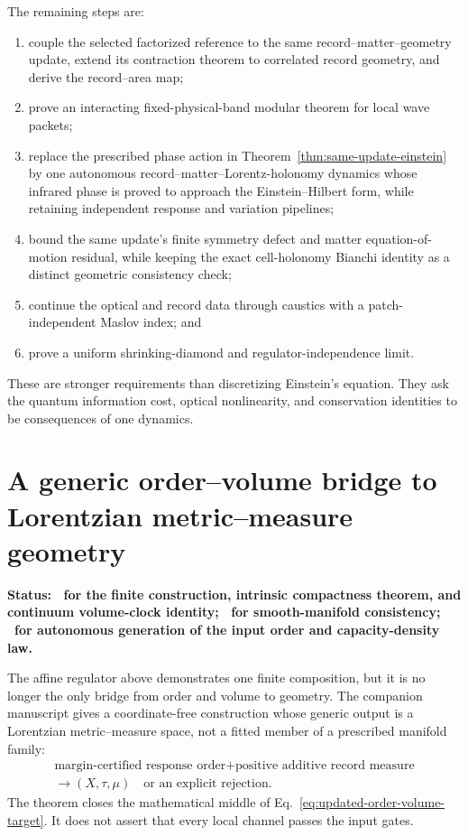 The remaining steps are:
\begin{enumerate}[label=(N\arabic*)]
\item couple the selected factorized reference to the same
record--matter--geometry update, extend its contraction theorem to correlated
record geometry, and derive the record--area map;
\item prove an interacting fixed-physical-band modular theorem for local
wave packets;
\item replace the prescribed phase action in
Theorem~\ref{thm:same-update-einstein} by one autonomous
record--matter--Lorentz-holonomy dynamics whose infrared phase is proved to
approach the Einstein--Hilbert form, while retaining independent response and
variation pipelines;
\item bound the same update's finite symmetry defect and matter
equation-of-motion residual, while keeping the exact cell-holonomy Bianchi
identity as a distinct geometric consistency check;
\item continue the optical and record data through caustics with a
patch-independent Maslov index; and
\item prove a uniform shrinking-diamond and regulator-independence limit.
\end{enumerate}
These are stronger requirements than discretizing Einstein's equation.  They
ask the quantum information cost, optical nonlinearity, and conservation
identities to be consequences of one dynamics.

\section{A generic order--volume bridge to Lorentzian metric--measure geometry}
\label{sec:generic-order-volume}
\label{sec:updated-order-volume}

\textbf{Status: \StatusAbstract\ for the finite construction, intrinsic
compactness theorem, and continuum volume-clock identity;
\StatusConditional\ for smooth-manifold consistency; \StatusOpen\ for
autonomous generation of the input order and capacity-density law.}

The affine regulator above demonstrates one finite composition, but it is no
longer the only bridge from order and volume to geometry.  The companion
manuscript \cite{XuGenericOrderVolume2026} gives a coordinate-free
construction whose generic output is a Lorentzian metric--measure space,
not a fitted member of a prescribed manifold family:
\begin{equation}
 \boxed{\begin{gathered}
 \text{margin-certified response order}
 +\text{positive additive record measure}\\
 \longrightarrow
 (X,\tau,\mu)\quad\text{or an explicit rejection}.
 \end{gathered}}
 \label{eq:updated-order-volume-target}
\end{equation}
The theorem closes the mathematical middle of
Eq.~\eqref{eq:updated-order-volume-target}.  It does not assert that every
local channel passes the input gates.

